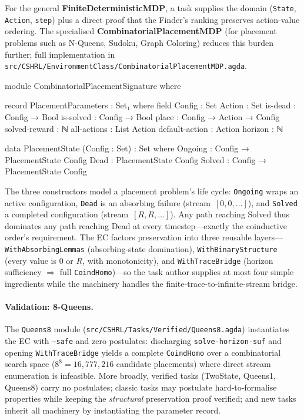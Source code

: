 \documentclass[runningheads]{llncs}
\newcommand{\fpath}[1]{\nolinkurl{#1}}
\begin{document}
For the general \textbf{FiniteDeterministicMDP}, a task supplies the domain (\texttt{State}, \texttt{Action}, \texttt{step}) plus a direct proof that the Finder's ranking preserves action-value ordering.  The specialised \textbf{CombinatorialPlacementMDP}\label{sec:cpmdp} (for placement problems such as N-Queens, Sudoku, Graph Coloring) reduces this burden further; full implementation in \fpath{src/CSHRL/EnvironmentClass/CombinatorialPlacementMDP.agda}.

\begin{code}[hide]
module CombinatorialPlacementSignature where
\end{code}

\begin{code}[hide]
  record PlacementParameters : Set₁ where
    field
      Config : Set
      Action : Set
      is-dead   : Config → Bool
      is-solved : Config → Bool
      place : Config → Action → Config
      solved-reward : ℕ
      all-actions : List Action
      default-action : Action
      horizon : ℕ

  data PlacementState (Config : Set) : Set where
    Ongoing : Config → PlacementState Config
    Dead    : PlacementState Config
    Solved  : Config → PlacementState Config
\end{code}

\noindent The three constructors model a placement problem's life cycle: \texttt{Ongoing} wraps an active configuration, \texttt{Dead} is an absorbing failure (stream~$[0,0,\ldots]$), and \texttt{Solved} a completed configuration (stream~$[R,R,\ldots]$).  Any path reaching Solved thus dominates any path reaching Dead at every timestep---exactly the coinductive order's requirement.  The EC factors preservation into three reusable layers---\texttt{WithAbsorbingLemmas} (absorbing-state domination), \texttt{WithBinaryStructure} (every value is $0$ or $R$, with monotonicity), and \texttt{WithTraceBridge} (horizon sufficiency $\Rightarrow$ full \texttt{CoindHomo})---so the task author supplies at most four simple ingredients while the machinery handles the finite-trace-to-infinite-stream bridge.

\paragraph{Validation: 8-Queens.}
The \texttt{Queens8} module (\fpath{src/CSHRL/Tasks/Verified/Queens8.agda}) instantiates the EC with \texttt{--safe} and zero postulates: discharging \texttt{solve-horizon-suf} and opening \texttt{WithTraceBridge} yields a complete \texttt{CoindHomo} over a combinatorial search space ($8^8 = 16{,}777{,}216$ candidate placements) where direct stream enumeration is infeasible.  More broadly, verified tasks (TwoState, Queens1, Queens8) carry no postulates; classic tasks may postulate hard-to-formalise properties while keeping the \emph{structural} preservation proof verified; and new tasks inherit all machinery by instantiating the parameter record.
\end{document}
